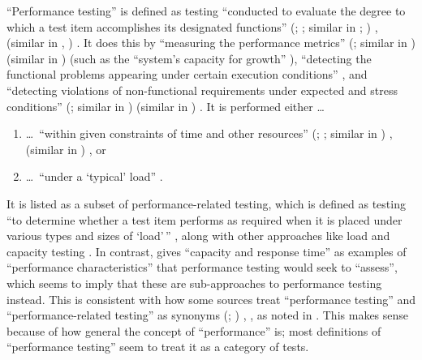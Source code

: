 ``Performance testing'' is defined as testing ``conducted to evaluate the
degree to which a test item accomplishes its designated functions''
\ifnotpaper
    (\citealp[p.~7]{IEEE2022}; \citeyear[p.~320]{IEEE2017}; similar in
    \citeyear[pp.~38-39]{IEEE2021}; \citealp[p.~1187]{Moghadam2019})%
\else
    \cite[p.~320]{IEEE2017}, \cite[p.~7]{IEEE2022} (similar in
    \cite[pp.~38-39]{IEEE2021}, \cite[p.~1187]{Moghadam2019})%
\fi. It does this
by ``measuring the performance metrics''
\ifnotpaper
    (\citealp[p.~1187]{Moghadam2019}; similar in \citealpISTQB{})
\else
    \cite[p.~1187]{Moghadam2019} (similar in \cite{ISTQB})
\fi (such as the ``system's capacity for growth''
\citep[p.~23]{Gerrard2000b}), ``detecting the functional problems appearing
under certain execution conditions'' \citep[p.~1187]{Moghadam2019}, and
``detecting violations of non-functional requirements under expected and
stress conditions'' \ifnotpaper
    (\citealp[p.~1187]{Moghadam2019}; similar in \citep[p.~5-9]{SWEBOK2024})%
\else
    \cite[p.~1187]{Moghadam2019} (similar in \cite[p.~5-9]{SWEBOK2024})%
\fi. It is performed either \dots\
\begin{enumerate}
    \item \dots\ ``within given constraints of time and other resources''
          \ifnotpaper
              (\citealp[p.~7]{IEEE2022}; \citeyear[p.~320]{IEEE2017};
              similar in \citealp[p.~1187]{Moghadam2019})%
          \else
              \cite[p.~320]{IEEE2017}, \cite[p.~7]{IEEE2022} (similar
              in \cite[p.~1187]{Moghadam2019})%
          \fi, or
    \item \dots\ ``under a `typical' load'' \citep[p.~39]{IEEE2021}.
\end{enumerate}

It is listed as a subset of performance-related testing, which is defined as
testing ``to determine whether a test item performs as required when it is
placed under various types and sizes of `load'\,'' \citeyearpar[p.~38]{IEEE2021},
along with other approaches like load and capacity testing
\citep[p.~22]{IEEE2022}. In contrast, \citet[p.~5-9]{SWEBOK2024}
gives ``capacity and response time'' as examples of ``performance
characteristics'' that performance testing would seek to ``assess'', which
seems to imply that these are sub-approaches to performance testing instead.
This is consistent with how some sources treat ``performance testing'' and
``performance-related testing'' as synonyms \ifnotpaper
    (\citealp[p.~5-9]{SWEBOK2024}; \citealp[p.~1187]{Moghadam2019})%
\else \cite[p.~5-9]{SWEBOK2024}, \cite[p.~1187]{Moghadam2019}%
\fi, as noted in . This makes sense because of how general the
concept of ``performance'' is; most definitions of ``performance testing'' seem
to treat it as a category of tests.

